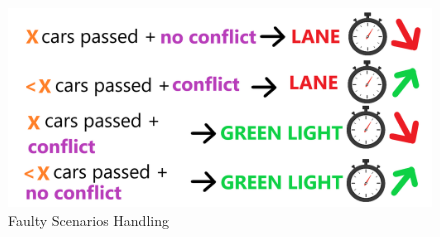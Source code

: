 \documentclass[17pt]{report}
\begin{document}
\begin{figure}[h!]
    \includegraphics[width=\textwidth]{Sketches/FaultyScenariosHandling.png}
    \caption{Faulty Scenarios Handling}
    \label{fig:Faulty Scenarios Handling}
\end{figure}
\end{document}
